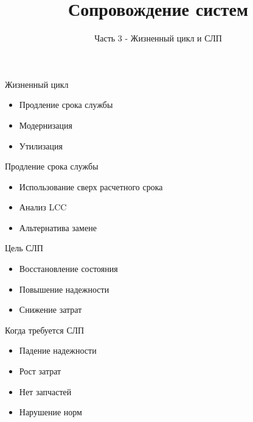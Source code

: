 \documentclass{beamer}
\title{Сопровождение систем}
\subtitle{Часть 3 - Жизненный цикл и СЛП}
\author{}
\date{}
\begin{document}
\frame{\titlepage}


\begin{frame}{Жизненный цикл}
\begin{itemize}
    \item Продление срока службы
    \item Модернизация
    \item Утилизация
\end{itemize}

\end{frame}


\begin{frame}{Продление срока службы}
\begin{itemize}
    \item Использование сверх расчетного срока
    \item Анализ LCC
    \item Альтернатива замене
\end{itemize}

\end{frame}


\begin{frame}{Цель СЛП}
\begin{itemize}
    \item Восстановление состояния
    \item Повышение надежности
    \item Снижение затрат
\end{itemize}

\end{frame}


\begin{frame}{Когда требуется СЛП}
\begin{itemize}
    \item Падение надежности
    \item Рост затрат
    \item Нет запчастей
    \item Нарушение норм
\end{itemize}

\end{frame}

\end{document}
